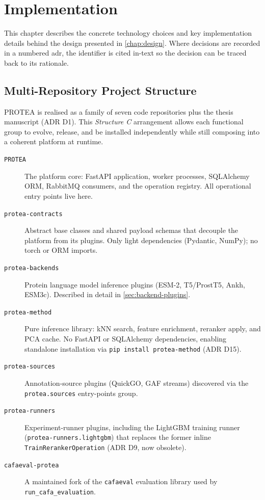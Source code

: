 \chapter{Implementation}
\label{chap:implementation}

This chapter describes the concrete technology choices and key implementation
details behind the design presented in \cref{chap:design}. Where decisions are
recorded in a numbered \gls{adr}, the identifier is cited in-text so the decision
can be traced back to its rationale.

\section{Multi-Repository Project Structure}
\label{sec:project-structure}

PROTEA is realised as a family of seven code repositories plus the thesis
manuscript (ADR D1). This \emph{Structure C} arrangement allows each
functional group to evolve, release, and be installed independently while
still composing into a coherent platform at runtime.

\begin{description}
  \item[\texttt{PROTEA}] The platform core: FastAPI application, worker
    processes, SQLAlchemy ORM, RabbitMQ consumers, and the operation
    registry. All operational entry points live here.
  \item[\texttt{protea-contracts}] Abstract base classes and shared payload
    schemas that decouple the platform from its plugins. Only light
    dependencies (Pydantic, NumPy); no torch or ORM imports.
  \item[\texttt{protea-backends}] Protein language model inference plugins
    (ESM-2, T5/ProstT5, Ankh, ESM3c). Described in detail in
    \cref{sec:backend-plugins}.
  \item[\texttt{protea-method}] Pure inference library: kNN search, feature
    enrichment, reranker apply, and PCA cache. No FastAPI or SQLAlchemy
    dependencies, enabling standalone installation via
    \texttt{pip install protea-method} (ADR D15).
  \item[\texttt{protea-sources}] Annotation-source plugins (QuickGO, GAF
    streams) discovered via the \texttt{protea.sources} entry-points group.
  \item[\texttt{protea-runners}] Experiment-runner plugins, including the
    LightGBM training runner (\texttt{protea-runners.lightgbm}) that replaces
    the former inline \texttt{TrainRerankerOperation} (ADR D9, now obsolete).
  \item[\texttt{cafaeval-protea}] A maintained fork of the
    \texttt{cafaeval} evaluation library used by \texttt{run\_cafa\_evaluation}.
\end{description}

